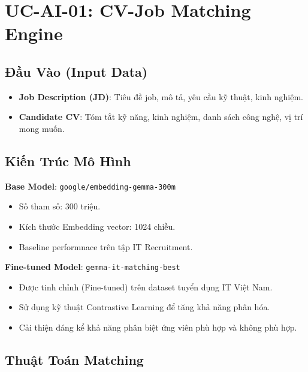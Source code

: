 \documentclass[12pt, a4paper]{report}
\begin{document}
\section{UC-AI-01: CV-Job Matching Engine}

\subsection{Đầu Vào (Input Data)}

\begin{itemize}
    \item \textbf{Job Description (JD)}: Tiêu đề job, mô tả, yêu cầu kỹ thuật, kinh nghiệm.
    \item \textbf{Candidate CV}: Tóm tắt kỹ năng, kinh nghiệm, danh sách công nghệ, vị trí mong muốn.
\end{itemize}

\subsection{Kiến Trúc Mô Hình}

\textbf{Base Model}: \texttt{google/embedding-gemma-300m}
\begin{itemize}
    \item Số tham số: 300 triệu.
    \item Kích thước Embedding vector: 1024 chiều.
    \item Baseline performnace trên tập IT Recruitment.
\end{itemize}

\textbf{Fine-tuned Model}: \texttt{gemma-it-matching-best}
\begin{itemize}
    \item Được tinh chỉnh (Fine-tuned) trên dataset tuyển dụng IT Việt Nam.
    \item Sử dụng kỹ thuật Contrastive Learning để tăng khả năng phân hóa.
    \item Cải thiện đáng kể khả năng phân biệt ứng viên phù hợp và không phù hợp.
\end{itemize}

\subsection{Thuật Toán Matching}
\end{document}
